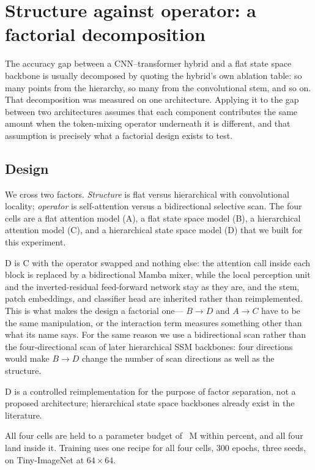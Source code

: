 \section{Structure against operator: a factorial decomposition}
\label{sec:factorial}

The accuracy gap between a CNN--transformer hybrid and a flat state space
backbone is usually decomposed by quoting the hybrid's own ablation table:
so many points from the hierarchy, so many from the convolutional stem, and
so on. That decomposition was measured on one architecture. Applying it to
the gap between two architectures assumes that each component contributes the
same amount when the token-mixing operator underneath it is different, and
that assumption is precisely what a factorial design exists to test.

\subsection{Design}

We cross two factors. \emph{Structure} is flat versus hierarchical with
convolutional locality; \emph{operator} is self-attention versus a
bidirectional selective scan. The four cells are a flat attention model
(A), a flat state space model (B), a hierarchical attention model (C), and a
hierarchical state space model (D) that we built for this experiment.

D is C with the operator swapped and nothing else: the attention call inside
each block is replaced by a bidirectional Mamba mixer, while the local
perception unit and the inverted-residual feed-forward network stay as they
are, and the stem, patch embeddings, and classifier head are inherited
rather than reimplemented. This is what makes the design a factorial one---
$B \to D$ and $A \to C$ have to be the same manipulation, or the interaction
term measures something other than what its name says. For the same reason
we use a bidirectional scan rather than the four-directional scan of later
hierarchical SSM backbones: four directions would make $B \to D$ change the
number of scan directions as well as the structure.

D is a controlled reimplementation for the purpose of factor separation, not
a proposed architecture; hierarchical state space backbones already exist in
the literature.

All four cells are held to a parameter budget of \ParamBudget{}~M within
\ParamTolerance{} percent, and all four land inside it. Training uses one recipe for all four cells,
$300$ epochs, three seeds, on Tiny-ImageNet at $64 \times 64$.


